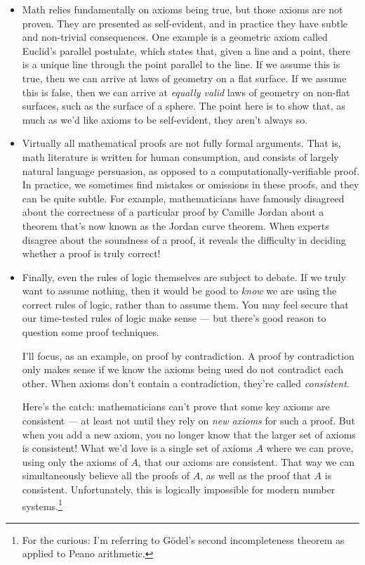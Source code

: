 \documentclass[11pt, oneside]{article}
\theoremstyle{argtstyle}
\begin{document}
\begin{itemize}
    \item Math relies fundamentally on axioms being true, but those axioms are
        not proven. They are presented as self-evident, and in practice they
        have subtle and non-trivial consequences.
        One example is a geometric axiom called Euclid's parallel postulate,
        which states that, given a line and a point, there is a unique line
        through the point parallel to the line. If we assume this is true, then
        we can arrive at laws of geometry on a flat surface. If we assume this
        is false, then we can arrive at {\em equally valid} laws of geometry on
        non-flat surfaces, such as the surface of a sphere. The point here is to
        show that, as much as we'd like axioms to be self-evident, they aren't
        always so.
    \item Virtually all mathematical proofs are not fully formal
        arguments. That is, math literature is written for human consumption,
        and consists of largely natural language persuasion, as opposed to a
        computationally-verifiable proof. In practice, we sometimes find
        mistakes or omissions in these proofs, and they can be quite subtle. For
        example, mathematicians have famously disagreed about the correctness of a particular proof
        by Camille Jordan about a theorem that's now
        known as the Jordan curve theorem.
        When experts disagree about the soundness of
        a proof, it reveals the difficulty in
        deciding whether a proof is truly correct!
    \item Finally, even the rules of logic themselves are subject to debate. If
        we truly want to assume nothing, then it would be good to {\em know} we
        are using the correct rules of logic, rather than to assume them.
        You may feel secure that our time-tested rules of logic make sense ---
        but there's good reason to question some proof techniques.

        I'll focus, as an example, on proof by contradiction.
        A proof by contradiction
        only makes sense if we know the axioms being used do not contradict each
        other.
        When axioms don't contain a contradiction, they're called {\em
        consistent}.

        Here's the catch: mathematicians can't prove that some key axioms are
        consistent --- at least not until they rely on {\em new axioms} for such
        a proof. But when you add a new axiom, you no longer know that the
        larger set of axioms is consistent! What we'd love is a single set of
        axioms $A$ where we can prove, using only the axioms of $A$, that our
        axioms are consistent. That way we can simultaneously believe all the
        proofs of $A$, as
        well as the proof that $A$ is consistent. Unfortunately, this is
        logically impossible for modern number
        systems.\footnote{For
        the curious: I'm referring to G\"odel's second
        incompleteness theorem as applied to Peano arithmetic.}
        

\end{itemize}
\end{document}
